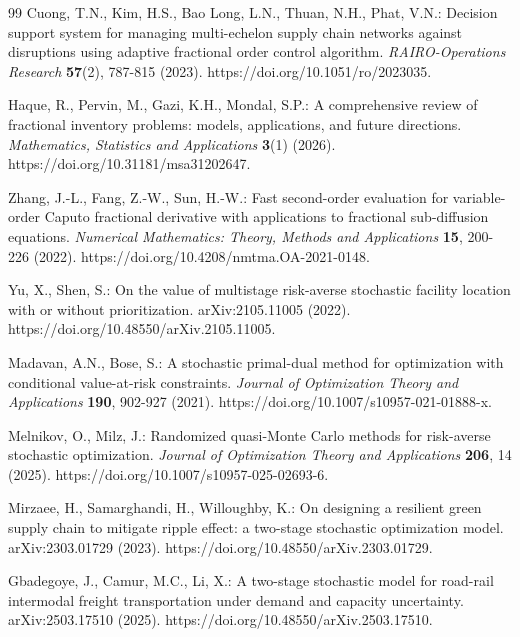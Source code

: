 \begin{thebibliography}{99}
Cuong, T.N., Kim, H.S., Bao Long, L.N., Thuan, N.H., Phat, V.N.: Decision support system for managing multi-echelon supply chain networks against disruptions using adaptive fractional order control algorithm. \emph{RAIRO-Operations Research} \textbf{57}(2), 787-815 (2023). https://doi.org/10.1051/ro/2023035.

Haque, R., Pervin, M., Gazi, K.H., Mondal, S.P.: A comprehensive review of fractional inventory problems: models, applications, and future directions. \emph{Mathematics, Statistics and Applications} \textbf{3}(1) (2026). https://doi.org/10.31181/msa31202647.

Zhang, J.-L., Fang, Z.-W., Sun, H.-W.: Fast second-order evaluation for variable-order Caputo fractional derivative with applications to fractional sub-diffusion equations. \emph{Numerical Mathematics: Theory, Methods and Applications} \textbf{15}, 200-226 (2022). https://doi.org/10.4208/nmtma.OA-2021-0148.

Yu, X., Shen, S.: On the value of multistage risk-averse stochastic facility location with or without prioritization. arXiv:2105.11005 (2022). https://doi.org/10.48550/arXiv.2105.11005.

Madavan, A.N., Bose, S.: A stochastic primal-dual method for optimization with conditional value-at-risk constraints. \emph{Journal of Optimization Theory and Applications} \textbf{190}, 902-927 (2021). https://doi.org/10.1007/s10957-021-01888-x.

Melnikov, O., Milz, J.: Randomized quasi-Monte Carlo methods for risk-averse stochastic optimization. \emph{Journal of Optimization Theory and Applications} \textbf{206}, 14 (2025). https://doi.org/10.1007/s10957-025-02693-6.

Mirzaee, H., Samarghandi, H., Willoughby, K.: On designing a resilient green supply chain to mitigate ripple effect: a two-stage stochastic optimization model. arXiv:2303.01729 (2023). https://doi.org/10.48550/arXiv.2303.01729.

Gbadegoye, J., Camur, M.C., Li, X.: A two-stage stochastic model for road-rail intermodal freight transportation under demand and capacity uncertainty. arXiv:2503.17510 (2025). https://doi.org/10.48550/arXiv.2503.17510.

\end{thebibliography}
